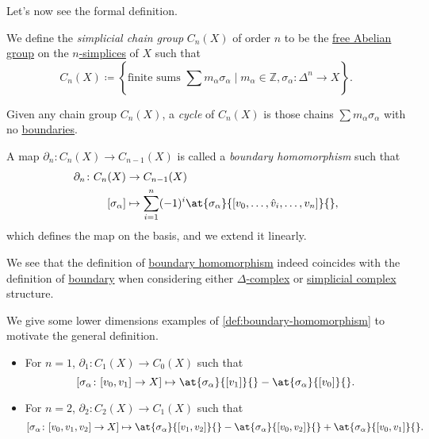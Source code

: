 Let's now see the formal definition.
\begin{definition}\label{def:simplicial-chain-group}
	We define the \emph{simplicial chain group} \(C_{n} (X)\) of order \(n\) to be the \hyperref[def:free-Abelian-group]{free Abelian group} on the \hyperref[def:standard-simplex]{\(n\)-simplices} of \(X\) such
	that
	\[
		C_{n} (X) \coloneqq \left\{\text{finite sums } \sum\limits_{}^{} m_\alpha \sigma _\alpha \mid m_\alpha \in \mathbb{Z} , \sigma _\alpha \colon \Delta ^n \to X\right\}.
	\]
\end{definition}

\begin{definition}[Cycle]\label{def:cycle}
	Given any chain group \(C_{n} (X)\), a \emph{cycle} of \(C_{n} (X)\) is those chains \(\sum m_\alpha \sigma _\alpha\)
	with no \hyperref[def:boundary]{boundaries}.
\end{definition}

\begin{definition}\label{def:boundary-homomorphism}
	A map \(\partial_{n} \colon C_{n} (X)\to C_{n-1}(X) \) is called a \emph{boundary homomorphism} such that
	\[
		\begin{split}
			\partial_{n} \colon C_{n} (X) & \to C_{n-1}(X)                                                                                         \\
			[\sigma _\alpha ]             & \mapsto \sum\limits_{i=1}^{n} (-1)^i \at{\sigma _\alpha}{[v_0, \dots , \hat{v}_{i}, \dots , v_{n}]}{},
		\end{split}
	\]
	which defines the map on the basis, and we extend it linearly.
\end{definition}
\begin{remark}
	We see that the definition of \hyperref[def:boundary-homomorphism]{boundary homomorphism} indeed coincides with the definition of
	\hyperref[def:boundary]{boundary} when considering either \hyperref[def:delta-complex]{\(\Delta\)-complex} or
	\hyperref[def:simplicial-complex]{simplicial complex} structure.
\end{remark}

\begin{eg}
	We give some lower dimensions examples of \autoref{def:boundary-homomorphism} to motivate the general definition.
	\begin{itemize}
		\item For \(n=1\), \(\partial_1\colon C_1(X)\to C_0(X)\) such that
		      \[
			      [\sigma _\alpha \colon [v_0, v_1]\to X]\mapsto \at{\sigma _\alpha }{[v_1]}{} - \at{\sigma _\alpha }{[v_0]}{}.
		      \]
		\item For \(n=2\), \(\partial_2\colon C_2(X)\to C_1(X)\) such that
		      \[
			      [\sigma _\alpha \colon [v_0, v_1, v_2]\to X]\mapsto \at{\sigma _\alpha }{[v_1,v_2]}{} - \at{\sigma _\alpha }{[v_0, v_2]}{} + \at{\sigma _\alpha }{[v_0, v_1]}{}.
		      \]
	\end{itemize}
\end{eg}

